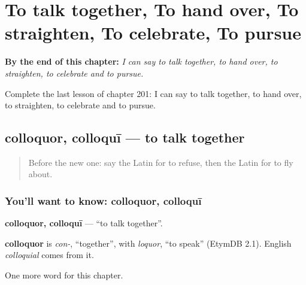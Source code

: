 
\chapter{To talk together, To hand over, To straighten, To celebrate, To pursue}
\label{ch:la-to-talk-together-to-hand-over-to-straighten-to-celebrate-to-pursue}

\begin{chapteropening}
\textbf{By the end of this chapter:} \emph{I can say to talk together, to hand over, to straighten, to celebrate and to pursue.}

Complete the last lesson of chapter 201: I can say to talk together, to hand over, to straighten, to celebrate and to pursue.
\end{chapteropening}

\section[colloquor, colloquī]{colloquor, colloquī — to talk together}

\label{lesson:LA-C201-colloquor}



\begin{quote}
Before the new one: say the Latin for to refuse, then the Latin for to fly about.
\end{quote}

\subsection*{You'll want to know: colloquor, colloquī}
\textbf{colloquor, colloquī} — \textquotedblleft{}to talk together\textquotedblright{}.

\begin{cousinweb}
\textbf{colloquor} is \emph{con-}, \textquotedblleft{}together\textquotedblright{}, with \emph{loquor}, \textquotedblleft{}to speak\textquotedblright{} (EtymDB 2.1). English \emph{colloquial} comes from it.
\end{cousinweb}

\begin{grammarlens}[title={What you've built}]
One more word for this chapter.
\end{grammarlens}

